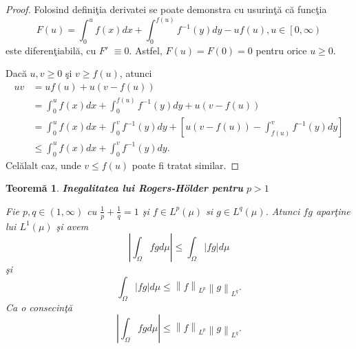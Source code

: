 \documentclass[a4paper,12pt,oneside]{report}
\newtheorem{theorem}{Teorem\u a}
\begin{document}
\begin{proof}
Folosind defini\c{t}ia derivatei se poate demonstra cu usurin\c{t}\u{a} c\u{a} func\c{t}ia
\begin{displaymath}
  F\left ( u \right )= \int_{0}^{u}f\left ( x \right )dx + \int_{0}^{f\left ( u \right )}f^{-1}\left ( y \right )dy -uf\left ( u \right ), u \in \left [ 0,\infty  \right )
\end{displaymath}
este diferen\c{t}iabil\u{a}, cu \({F}'\) $\equiv 0.$ Astfel, \(F\left ( u \right )= F\left ( 0 \right )= 0\) pentru orice \(u\geq 0\).

Dac\u{a} \(u, v \geq 0\)  \c{s}i \(v\geq f\left ( u \right )\), atunci
\begin{equation} \nonumber
    \begin{split}
       uv & =  uf\left ( u \right )+ u\left ( v- f\left ( u \right ) \right ) \\ &  =  \int_{0}^{u}f\left ( x \right )dx + \int_{0}^{f\left ( u \right )}f^{-1}\left ( y \right )dy + u\left ( v - f\left ( u \right ) \right ) \\ &  = \int_{0}^{u}f\left ( x \right )dx + \int_{0}^{v}f^{-1}\left ( y \right )dy + \left [ u\left ( v-f\left ( u \right )  \right ) - \int_{f\left ( u \right )}^{v}f^{-1}\left ( y \right )dy\right ] \\ &  \leq \int_{0}^{u}f\left ( x \right )dx + \int_{0}^{v}f^{-1}\left ( y \right )dy.
    \end{split}
\end{equation}
Cel\u{a}lalt caz, unde \(v\leq f\left ( u \right )\) poate fi tratat similar.
\end{proof}

\begin{theorem}

\textbf{Inegalitatea lui Rogers-Hölder pentru} \(p > 1\)

Fie \(p,q \in \left ( 1, \infty  \right )\) cu \(\frac{1}{p} + \frac{1}{q} = 1\) \c{s}i  \(f\in L^{p}\left ( \mu  \right )\) si \(g\in L^{q}\left ( \mu  \right )\). Atunci \(fg\) apar\c{t}ine lui \(L^{1}\left ( \mu  \right )\) \c{s}i avem
\begin{displaymath}
  \left | \int_{\Omega}^{} fg  d\mu \right |\leq \int_{\Omega}^{}\left | fg \right |d\mu \label{eq:1.5} \tag{1.5}
\end{displaymath}
\c{s}i
\begin{displaymath}
  \int_{\Omega}^{}\left | fg \right |d\mu \leq \left \| f \right \|_{L^{p}}\left \| g \right \|_{{L}^{q}}. \label{eq:1.6} \tag{1.6}
\end{displaymath}
Ca o consecin\c{t}\u{a}
\begin{displaymath}
  \left | \int_{\Omega}^{} fg  d\mu \right |\leq \left \| f \right \|_{L^{p}}\left \| g \right \|_{{L}^{q}}. \label{eq:1.7} \tag{1.7}
\end{displaymath}
\end{theorem}
\end{document}
